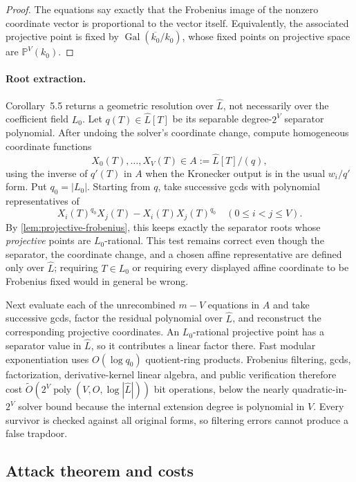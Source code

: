 \documentclass[10pt,a4paper]{article}
\newcommand{\PP}{\mathbb P}
\begin{document}
\begin{proof}
The equations say exactly that the Frobenius image of the nonzero coordinate vector is proportional to the vector itself.  Equivalently, the associated projective point is fixed by $\operatorname{Gal}(\overline{k_0}/k_0)$, whose fixed points on projective space are $\PP^V(k_0)$.
\end{proof}

\paragraph{Root extraction.}
Corollary~5.5 returns a geometric resolution over $\widehat L$, not necessarily over the coefficient field $L_0$.  Let $q(T)\in\widehat L[T]$ be its separable degree-$2^V$ separator polynomial.  After undoing the solver's coordinate change, compute homogeneous coordinate functions
\[
X_0(T),\ldots,X_V(T)\in A:=\widehat L[T]/(q),
\]
using the inverse of $q'(T)$ in $A$ when the Kronecker output is in the usual $w_i/q'$ form.  Put $q_0=|L_0|$.  Starting from $q$, take successive gcds with polynomial representatives of
\[
X_i(T)^{q_0}X_j(T)-X_i(T)X_j(T)^{q_0}
\quad(0\le i<j\le V).
\]
By \cref{lem:projective-frobenius}, this keeps exactly the separator roots whose \emph{projective} points are $L_0$-rational.  This test remains correct even though the separator, the coordinate change, and a chosen affine representative are defined only over $\widehat L$; requiring $T\in L_0$ or requiring every displayed affine coordinate to be Frobenius fixed would in general be wrong.

Next evaluate each of the unrecombined $m-V$ equations in $A$ and take successive gcds, factor the residual polynomial over $\widehat L$, and reconstruct the corresponding projective coordinates.  An $L_0$-rational projective point has a separator value in $\widehat L$, so it contributes a linear factor there.  Fast modular exponentiation uses $O(\log q_0)$ quotient-ring products.  Frobenius filtering, gcds, factorization, derivative-kernel linear algebra, and public verification therefore cost $\widetilde O(2^V\operatorname{poly}(V,O,\log|\widehat L|))$ bit operations, below the nearly quadratic-in-$2^V$ solver bound because the internal extension degree is polynomial in $V$.  Every survivor is checked against all original forms, so filtering errors cannot produce a false trapdoor.

\subsection{Attack theorem and costs}
\end{document}
